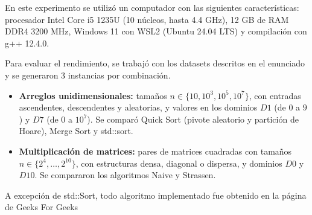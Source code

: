 En este experimento se utilizó un computador con las siguientes características: procesador Intel Core i5 1235U (10 núcleos, hasta 4.4 GHz), 12 GB de RAM DDR4 3200 MHz, Windows 11 con WSL2 (Ubuntu 24.04 LTS) y compilación con g++ 12.4.0.

Para evaluar el rendimiento, se trabajó con los datasets descritos en el enunciado y se generaron $3$ instancias por combinación.
\begin{itemize}
    \item \textbf{Arreglos unidimensionales:} tamaños $n \in \{10, 10^3, 10^5, 10^7\}$, con entradas ascendentes, descendentes y aleatorias, y valores en los dominios $D1$ (de $0$ a $9$) y $D7$ (de $0$ a $10^7$). Se comparó Quick Sort (pivote aleatorio y partición de Hoare), Merge Sort y std::sort.
    \item \textbf{Multiplicación de matrices:} pares de matrices cuadradas con tamaños $n \in \{2^4, \ldots, 2^{10}\}$, con estructuras densa, diagonal o dispersa, y dominios $D0$ y $D10$. Se compararon los algoritmos Naive y Strassen.
\end{itemize}

A excepción de std::Sort, todo algoritmo implementado fue obtenido en la página de Geeks For Geeks